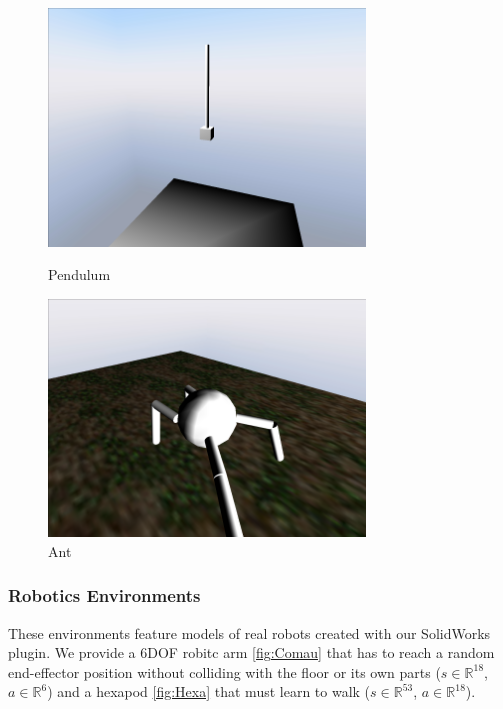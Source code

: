 \documentclass{svproc}
\begin{document}
\begin{figure}[ht]
 \begin{minipage}[b]{0.6\linewidth}
    \centering
    \includegraphics[width=0.75\textwidth]{Figures/pendulum.png}
    \caption{Pendulum}
    \label{fig:pendulum}
 \end{minipage}
 \hspace{0.4cm}
 \begin{minipage}[b]{0.6\linewidth}
    \centering
    \includegraphics[width=0.75\textwidth]{Figures/ant.png}
    \caption{Ant}
    \label{fig:ant}
 \end{minipage}
\end{figure}

\subsubsection{Robotics Environments}
These environments feature models of real robots created with our SolidWorks plugin. We provide a 6DOF robitc arm \ref{fig:Comau} that has to reach a random end-effector position without colliding with the floor or its own parts ($s \in \mathbb{R}^{18}$, $a \in \mathbb{R}^6$) and a hexapod \ref{fig:Hexa} that must learn to walk ($s \in \mathbb{R}^{53}$, $a \in \mathbb{R}^{18}$).
\end{document}
